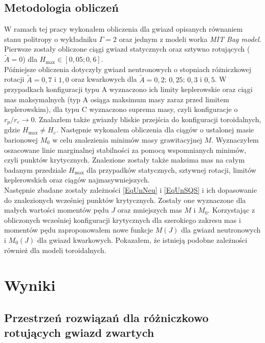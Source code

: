 \documentclass{bachelor_thesis}
\begin{document}
        \section{Metodologia obliczeń}
            W ramach tej pracy wykonałem obliczenia dla gwiazd opisanych równaniem stanu politropy o wykładniku $\Gamma=2$ oraz jednym z modeli worka \textit{MIT Bag model}. Pierwsze zostały obliczone ciągi gwiazd statycznych oraz sztywno rotujących ($\tilde{A}=0$) dla $H_\textrm{max}\in [0,05;0,6]$. \\
            \indent Późniejsze obliczenia dotyczyły gwiazd neutronowych o stopniach różniczkowej rotacji $\tilde{A}=0,7$ i $1,0$ oraz kwarkowych dla $\tilde{A}=0,2$; $0,25$; $0,3$ i $0,5$. W przypadkach konfiguracji typu A wyznaczono ich limity keplerowskie oraz ciągi mas maksymalnych (typ A osiąga maksimum masy zaraz przed limitem keplerowskim), dla typu C wyznaczono suprema masy, czyli konfiguracje o $r_p/r_e\rightarrow 0$. Znalazłem także gwiazdy bliskie przejścia do konfiguracji toroidalnych, gdzie $H_\textrm{max}\neq H_\textrm{c}$. Następnie wykonałem obliczenia dla ciągów o ustalonej masie barionowej $M_0$ w celu znalezienia minimów masy grawitacyjnej $M$. Wyznaczyłem oszacowane linie marginalnej stabilności za pomocą wspomnianych minimów, czyli punktów krytycznych. Znalezione zostały także maksima mas na całym badanym przedziale $H_\textrm{max}$ dla przypadków statycznych, sztywnej rotacji, limitów keplerowskich oraz ciągów najmasywniejszych.\\
            \indent Następnie zbadane zostały zależności \ref{EqUnNeu} i \ref{EqUnSQS} i ich dopasowanie do znalezionych wcześniej punktów krytycznych. Zostały one wyznaczone dla małych wartości momentów pędu $J$ oraz mniejszych mas $M$ i $M_0$.  Korzystając z obliczonych wcześniej konfiguracji krytycznych dla szerokiego zakresu mas i momentów pędu zaproponowałem nowe funkcje $M(J)$ dla gwiazd neutronowych i $M_0(J)$ dla gwiazd kwarkowych. Pokazałem, że istnieją podobne zależności również dla modeli toroidalnych.
    \chapter{Wyniki}
        \section{Przestrzeń rozwiązań dla różniczkowo rotujących gwiazd zwartych}
\end{document}
